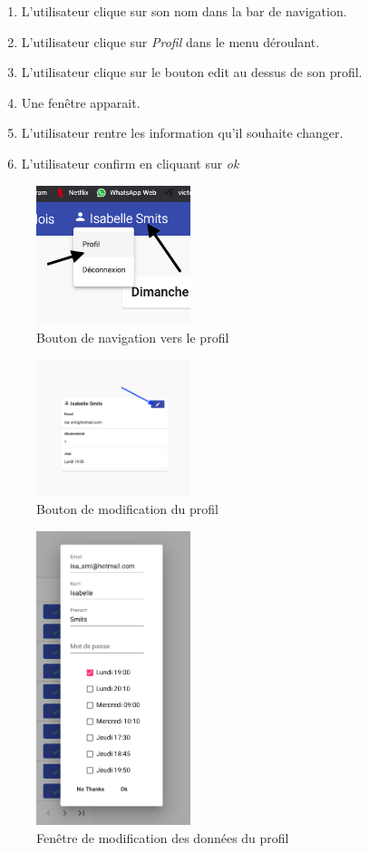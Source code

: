 \begin{enumerate}
	\item L'utilisateur clique sur son nom dans la bar de navigation.
	\item L'utilisateur clique sur \textit{Profil} dans le menu déroulant.
	\item L'utilisateur clique sur le bouton edit au dessus de son profil. 
	\item Une fenêtre apparait. 
	\item L'utilisateur rentre les information qu'il souhaite changer. 
	\item L'utilisateur confirm en cliquant sur \textit{ok}
\end{enumerate}

\vspace{\baselineskip}
\begin{figure}[h]
	\includegraphics[width=0.4\textwidth,center]{Figures/us7-1}
	\caption{Bouton de navigation vers le profil}
\end{figure}

\begin{figure}[h]
	\includegraphics[width=0.4\textwidth,center]{Figures/us8-1}
	\caption{Bouton de modification du profil}
\end{figure}

\newpage
\begin{figure}[h]
	\includegraphics[width=0.4\textwidth,center]{Figures/us8-2}
	\caption{Fenêtre de modification des données du profil}
\end{figure}
